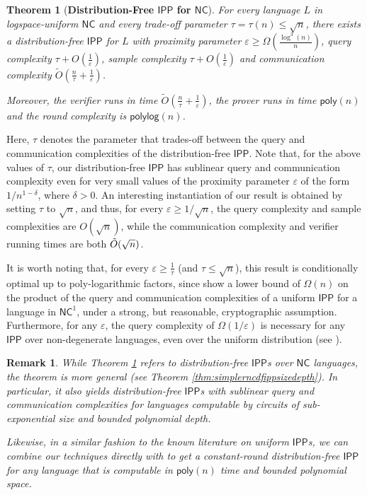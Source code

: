 \documentclass[10pt,a4paper]{article}
\newtheorem{theorem}{Theorem}[section]
\newtheorem{remark}{Remark}
\newcommand{\poly}{\mathsf{poly}}
\newcommand{\polylog}{\mathsf{polylog}}
\newcommand{\NC}{\mathsf{NC}}
\newcommand{\IPP}{\mathsf{IPP}}
\newcommand{\eps}{\varepsilon}
\begin{document}
\begin{theorem}[\textbf{Distribution-Free $\IPP$ for $\NC$}]
    \label{thm:informal_dfipp_nc}
    For every language $L$ in logspace-uniform $\NC$ and every trade-off parameter $\tau=\tau(n) \leq \sqrt{n}$, there exists a distribution-free $\IPP$ for $L$ with proximity parameter $\varepsilon\geq \Omega\left(\frac{\log^3 (n)}{n}\right)$, query complexity $\tau+O\left(\frac{1}{\eps}\right)$, sample complexity $\tau+O\left(\frac{1}{\eps}\right)$ and communication complexity $\tilde{O}\left(\frac{n}{\tau}+\frac{1}{\eps}\right)$. 
    
    Moreover, the verifier runs in time $\tilde{O}\left(\frac{n}{\tau} +\frac{1}{\eps}\right)$, the prover runs in time $\poly(n)$ and the round complexity is $\polylog(n)$.
\end{theorem}


Here, $\tau$ denotes the parameter that trades-off between the query and communication complexities of the distribution-free $\IPP$. Note that, for the above values of $\tau$, our distribution-free $\IPP$ has sublinear query and communication complexity even for very small values of the proximity parameter $\varepsilon$ of the form $1/n^{1-\delta}$, where $\delta > 0$. An interesting instantiation of our result is obtained by setting $\tau$ to $\sqrt{n}$, and thus, for every $\eps \geq 1/\sqrt{n}$, the query complexity and sample complexities are $O(\sqrt{n})$, while the communication complexity and verifier running times are both $\Tilde{O}(\sqrt{n})$. 

It is worth noting that, for every $\eps\geq \frac{1}{\tau}$ (and $\tau \leq \sqrt{n}$), this result is conditionally optimal up to poly-logarithmic factors, since \cite{KR15} show a lower bound of $\Omega(n)$ on the product of the query and communication complexities of a uniform $\IPP$ for a language in $\NC^1$, under a strong, but reasonable, cryptographic assumption. Furthermore, for any $\varepsilon$, the query complexity of $\Omega(1/\varepsilon)$ is necessary for any $\IPP$ over non-degenerate languages, even over the uniform distribution (see \cite[Remark 1.2]{RVW}).

\begin{remark}
While Theorem \ref{thm:informal_dfipp_nc} refers to distribution-free $\IPP$s over $\NC$ languages, the theorem is more general (see Theorem \ref{thm:simplerncdfippsizedepth}). In particular, it also yields distribution-free $\IPP$s with sublinear query and communication complexities for languages computable by circuits of sub-exponential size and bounded polynomial depth.

Likewise, in a similar fashion to the known literature on uniform $\IPP$s, we can combine our techniques directly with \cite{RRR21} to get a constant-round distribution-free $\IPP$ for any language that is computable in $\poly(n)$ time and bounded polynomial space.
\end{remark}
\end{document}

